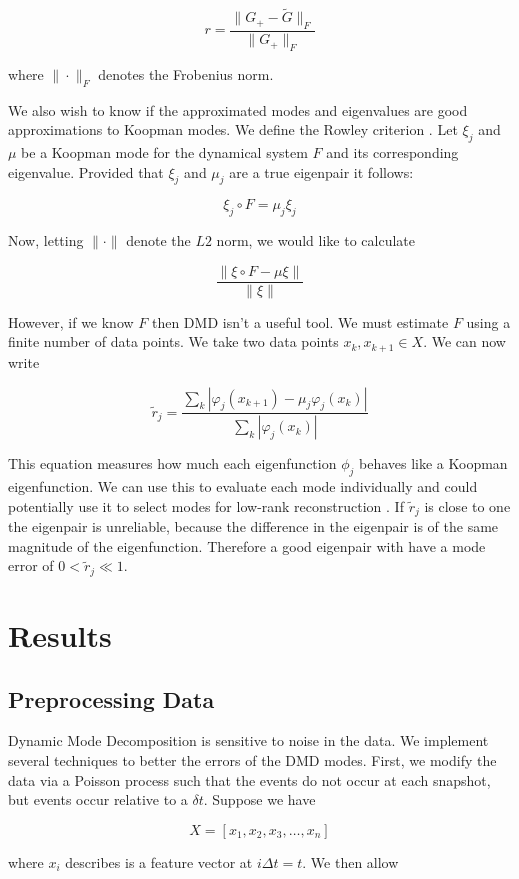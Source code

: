 $$
r = \frac{\|G_{+} - {\tilde G} \|_F}{\|G_{+}\|_F}
$$

\noindent where $\| \cdot \|_F$ denotes the Frobenius norm.

We also wish to know if the approximated modes and eigenvalues are good approximations to 
Koopman modes. We define the Rowley criterion \cite{zhang2017evaluating}. Let $\xi_j$ and $\mu$ be a Koopman mode for the
 dynamical system $F$ and its corresponding eigenvalue. Provided that $\xi_j$ and $\mu_j$ are
a true eigenpair it follows:

$$
\xi_j \circ F = \mu_j \xi_j
$$

\noindent Now, letting $\|\cdot\|$ denote the $L2$ norm, we would like to calculate 

$$
\frac{\| \xi \circ F - \mu \xi \|}{\| \xi \|}
$$

\noindent However, if we know $F$ then DMD isn't a useful tool.
We must estimate $F$ using a finite number of data points. We take
two data points $x_k, x_{k+1} \in X$. We can now write 

$$
{\tilde r}_{j} = \frac{\sum_{k} |\varphi_j(x_{k+1}) - \mu_j \varphi_j(x_{k})|}{\sum_{k} |\varphi_j(x_k )|}
$$

This equation measures how much each eigenfunction $\phi_j$ behaves like a Koopman eigenfunction. We can use 
this to evaluate each mode individually and could potentially use it to select modes for low-rank reconstruction \cite{zhang2017evaluating}. If ${{\tilde r}_j}$ is close to one
the eigenpair is unreliable, because the difference in the eigenpair is of the same magnitude of the eigenfunction. Therefore a 
good eigenpair with have a mode error of $0< {{\tilde r}_j} \ll 1$.

\chapter{Results}

\section{Preprocessing Data}
Dynamic Mode Decomposition is sensitive to
 noise in the data. We implement several techniques to better the errors of the DMD modes.
  First, we modify the data via a Poisson process such that the events do not occur at each
snapshot, but events occur relative to a $\delta t$. Suppose we have 

$$
X = [x_1,x_2,x_3,\dots, x_n]
$$

\noindent where $x_i$ describes is a feature vector at $i \Delta t = t$. We then allow


